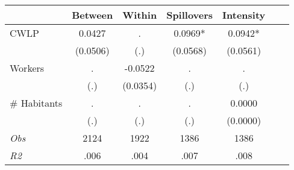 \begin{tabular}{l*{6}{c}}\hline&\multicolumn{1}{c}{Between}&\multicolumn{1}{c}{Within}&\multicolumn{1}{c}{Spillovers}&\multicolumn{1}{c}{Intensity}\\ \hline 
CWLP & 0.0427 & . & 0.0969* & 0.0942* \\
 & (0.0506) & (.) & (0.0568) & (0.0561) \\
Workers & . & -0.0522 & . & . \\
 & (.) & (0.0354) & (.) & (.) \\
\# Habitants & . & . & . & 0.0000 \\
  & (.) & (.) & (.) & (0.0000) \\
\hline \textit{Obs} & 2124 & 1922 & 1386 & 1386  \\ \textit{R2} & .006 & .004 & .007 & .008 \\ \hline \end{tabular}

